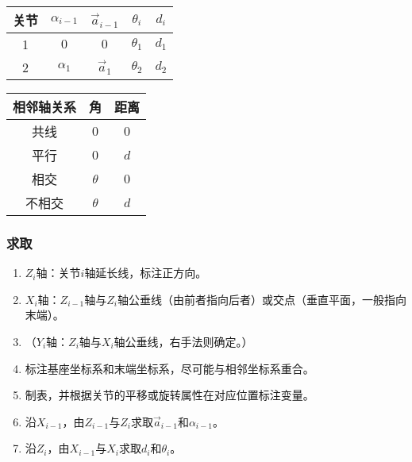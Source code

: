 \documentclass[
12pt, %
a4paper, 
oneside, %
headinclude,footinclude, %
]{scrartcl}
\begin{document}
\begin{minipage}{0.48\textwidth}
\centering
{}
\begin{tabular}{c|cccc}
\hline
关节 & $ \alpha_{i - 1} $ & $ \vec a_{i - 1} $ & $ \theta_i $ & $ d_i $ \\
\hline
1 & $ 0 $ & $ 0 $ & $ \theta_1 $ & $ d_1 $ \\
2 & $ \alpha_1 $ & $ \vec a_1 $ & $ \theta_2 $ & $ d_2 $ \\
\hline
\end{tabular}
\end{minipage}
\hfill
\begin{minipage}{0.48\textwidth}
\centering
{}
\begin{tabular}{c|cc}
\hline
相邻轴关系 & 角 & 距离 \\
\hline
共线 & $ 0 $ & $ 0 $ \\
平行 & $ 0 $ & $ d $ \\
相交 & $ \theta $ & $ 0 $ \\
不相交 & $ \theta $ & $ d $ \\
\hline
\end{tabular}
\end{minipage}
\subsubsection{求取}
\begin{enumerate}
\item $ Z_i $轴：关节$ i $轴延长线，标注正方向。
\item $ X_i $轴：$ Z_{i - 1} $轴与$ Z_i $轴公垂线（由前者指向后者）或交点（垂直平面，一般指向末端）。
\item （$ Y_i $轴：$ Z_i $轴与$ X_i $轴公垂线，右手法则确定。）
\item 标注基座坐标系和末端坐标系，尽可能与相邻坐标系重合。
\item 制表，并根据关节的平移或旋转属性在对应位置标注变量。
\item 沿$ X_{i - 1} $，由$ Z_{i - 1} $与$ Z_i $求取$ \vec a_{i - 1}  $和$ \alpha_{i - 1} $。
\item 沿$ Z_i $，由$ X_{i - 1} $与$ X_i $求取$ d_i $和$ \theta_i $。
\end{enumerate}
\end{document}
